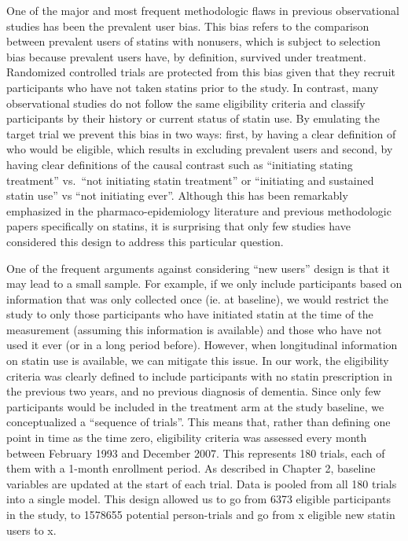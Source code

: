 \documentclass[
]{book}
\begin{document}
One of the major and most frequent methodologic flaws in previous observational studies has been the prevalent user bias\autocite{luijken2021,power2015}. This bias refers to the comparison between prevalent users of statins with nonusers, which is subject to selection bias because prevalent users have, by definition, survived under treatment\autocite{hernan2008,danaei2012}. Randomized controlled trials are protected from this bias given that they recruit participants who have not taken statins prior to the study. In contrast, many observational studies do not follow the same eligibility criteria and classify participants by their history or current status of statin use. By emulating the target trial we prevent this bias in two ways\autocite{hernan2016,hernan_robins_2016}: first, by having a clear definition of who would be eligible, which results in excluding prevalent users and second, by having clear definitions of the causal contrast such as ``initiating stating treatment'' vs.~``not initiating statin treatment'' or ``initiating and sustained statin use'' vs ``not initiating ever''. Although this has been remarkably emphasized in the pharmaco-epidemiology literature\autocite{ray2003,lund2015,johnson2013} and previous methodologic papers specifically on statins\autocite{danaei2012,power2015,emilsson2018}, it is surprising that only few studies have considered this design to address this particular question.

One of the frequent arguments against considering ``new users'' design is that it may lead to a small sample. For example, if we only include participants based on information that was only collected once (ie. at baseline), we would restrict the study to only those participants who have initiated statin at the time of the measurement (assuming this information is available) and those who have not used it ever (or in a long period before). However, when longitudinal information on statin use is available, we can mitigate this issue. In our work, the eligibility criteria was clearly defined to include participants with no statin prescription in the previous two years, and no previous diagnosis of dementia. Since only few participants would be included in the treatment arm at the study baseline, we conceptualized a ``sequence of trials''\autocite{danaei2013,garcia_albeniz2016}. This means that, rather than defining one point in time as the time zero, eligibility criteria was assessed every month between February 1993 and December 2007. This represents 180 trials, each of them with a 1-month enrollment period. As described in Chapter 2, baseline variables are updated at the start of each trial. Data is pooled from all 180 trials into a single model. This design allowed us to go from 6373 eligible participants in the study, to 1578655 potential person-trials and go from x eligible new statin users to x.
\end{document}
